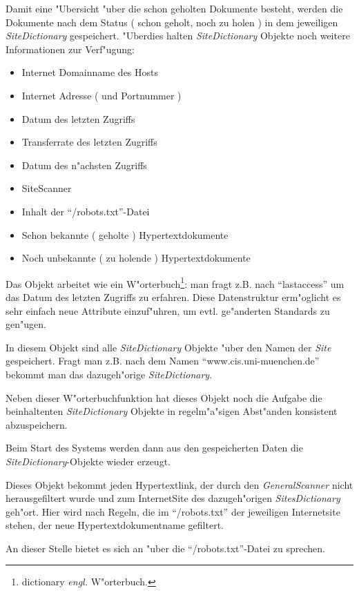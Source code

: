 \begin{description}
Damit eine "Ubersicht "uber die schon geholten Dokumente besteht, werden die Dokumente nach dem Status ( schon geholt, noch zu holen ) in dem jeweiligen {\em SiteDictionary} gespeichert. "Uberdies halten {\em SiteDictionary} Objekte noch weitere Informationen zur Verf"ugung:
\begin{itemize}
	\item	Internet Domainname des Hosts
	\item	Internet Adresse ( und Portnummer )
	\item 	Datum des letzten Zugriffs
	\item	Transferrate des letzten Zugriffs
	\item	Datum des n"achsten Zugriffs
	\item	SiteScanner
	\item	Inhalt der "`/robots.txt"'-Datei
	\item	Schon bekannte ( geholte ) Hypertextdokumente
	\item	Noch unbekannte ( zu holende ) Hypertextdokumente
\end{itemize}

Das Objekt arbeitet wie ein W"orterbuch\footnote{dictionary {\em engl.} W"orterbuch.}: man fragt z.B. nach "`lastaccess"' um das Datum des letzten Zugriffs zu erfahren. Diese Datenstruktur erm"oglicht es sehr einfach neue Attribute einzuf"uhren, um evtl. ge"anderten Standards zu gen"ugen.


\item[SitesDictionary:]	In diesem Objekt sind alle {\em SiteDictionary} Objekte "uber den Namen der {\em Site} gespeichert. Fragt man z.B. nach dem Namen "`www.cis.uni-muenchen.de"' bekommt man das dazugeh"orige {\em SiteDictionary}.

Neben dieser W"orterbuchfunktion hat dieses Objekt noch die Aufgabe die beinhaltenten {\em SiteDictionary} Objekte in regelm"a"sigen Abst"anden konsistent abzuspeichern.

Beim Start des Systems werden dann aus den gespeicherten Daten die {\em SiteDictionary}-Objekte wieder erzeugt.


\item[SiteScanner:]	Dieses Objekt bekommt jeden Hypertextlink, der durch den {\em GeneralScanner} nicht herausgefiltert wurde und zum InternetSite des dazugeh"origen {\em SitesDictionary} geh"ort. Hier wird nach Regeln, die im "`/robots.txt"' der jeweiligen Internetsite stehen, der neue Hypertextdokumentname gefiltert.

An dieser Stelle bietet es sich an "uber die "`/robots.txt"'-Datei zu sprechen. 


\end{description}
